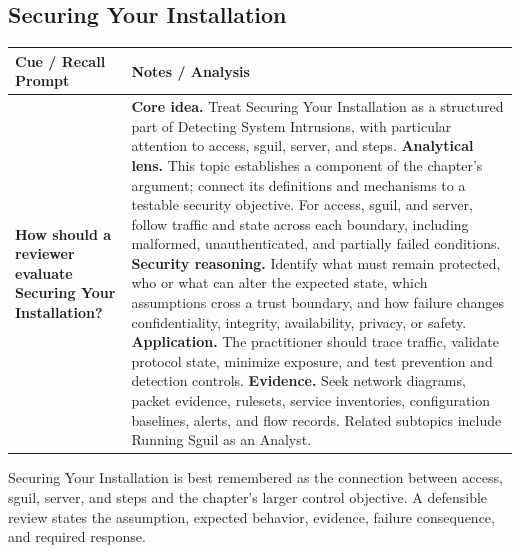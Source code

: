 \documentclass[11pt]{article}
\newcommand{\CornellHeader}{%
\rowcolor{Navy}\color{white}\bfseries Cue / Recall Prompt & \color{white}\bfseries Notes / Analysis\\\hline}
\newcommand{\CornellRow}[2]{%
\cellcolor{CueGray}\RaggedRight\textbf{#1} & \RaggedRight #2\\\hline}
\begin{document}
\subsection*{Securing Your Installation}
\begin{longtable}{>{\RaggedRight\arraybackslash}p{}|>{\RaggedRight\arraybackslash}p{}}
\CornellHeader
\CornellRow{How should a reviewer evaluate Securing Your Installation?}{\textbf{Core idea.} Treat Securing Your Installation as a structured part of Detecting System Intrusions, with particular attention to access, sguil, server, and steps. \textbf{Analytical lens.} This topic establishes a component of the chapter's argument; connect its definitions and mechanisms to a testable security objective. For access, sguil, and server, follow traffic and state across each boundary, including malformed, unauthenticated, and partially failed conditions. \textbf{Security reasoning.} Identify what must remain protected, who or what can alter the expected state, which assumptions cross a trust boundary, and how failure changes confidentiality, integrity, availability, privacy, or safety. \textbf{Application.} The practitioner should trace traffic, validate protocol state, minimize exposure, and test prevention and detection controls. \textbf{Evidence.} Seek network diagrams, packet evidence, rulesets, service inventories, configuration baselines, alerts, and flow records. Related subtopics include Running Sguil as an Analyst.}
\end{longtable}
\begin{topicsummary}
Securing Your Installation is best remembered as the connection between access, sguil, server, and steps and the chapter's larger control objective. A defensible review states the assumption, expected behavior, evidence, failure consequence, and required response.
\end{topicsummary}
\end{document}
